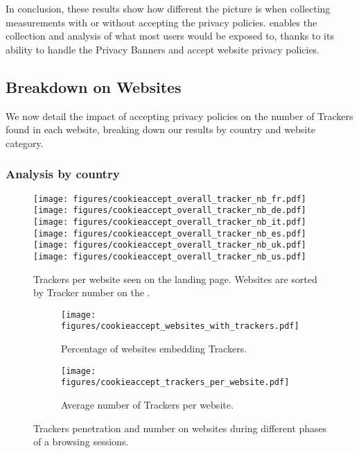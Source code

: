 In conclusion, these results show how different the picture is when collecting measurements with or without accepting the privacy policies. \TOOL enables the collection and analysis of what most users would be exposed to, thanks to its ability to handle the Privacy Banners and accept website privacy policies.



\subsection{Breakdown on Websites}

We now detail the impact of accepting privacy policies on the number of Trackers found in each website, breaking down our results by country and website category.

\subsubsection{Analysis by country}


\begin{figure*}
    \centering
    \texttt{[image: figures/cookieaccept\_overall\_tracker\_nb\_fr.pdf]}
    \texttt{[image: figures/cookieaccept\_overall\_tracker\_nb\_de.pdf]}
    \texttt{[image: figures/cookieaccept\_overall\_tracker\_nb\_it.pdf]}
    \texttt{[image: figures/cookieaccept\_overall\_tracker\_nb\_es.pdf]}
    \texttt{[image: figures/cookieaccept\_overall\_tracker\_nb\_uk.pdf]}
    \texttt{[image: figures/cookieaccept\_overall\_tracker\_nb\_us.pdf]}
	\caption{Trackers per website seen on the landing page. Websites are sorted by Tracker number on the \BEFORE.}
	\label{fig:ca_countries}
\end{figure*}

\begin{figure}
    \centering
    \begin{subfigure}[t]{0.495\columnwidth}
        \texttt{[image: figures/cookieaccept\_websites\_with\_trackers.pdf]}
        \caption{Percentage of websites embedding Trackers.}
        \label{fig:ca_country_one}
    \end{subfigure}
    \begin{subfigure}[t]{0.495\columnwidth}
        \texttt{[image: figures/cookieaccept\_trackers\_per\_website.pdf]}
        \caption{Average number of Trackers per website.}
        \label{fig:ca_country_avg}
    \end{subfigure}
	\caption{Trackers penetration and number 
	on websites during different phases of a browsing sessions.}
	\label{fig:ca_country}
\end{figure}


